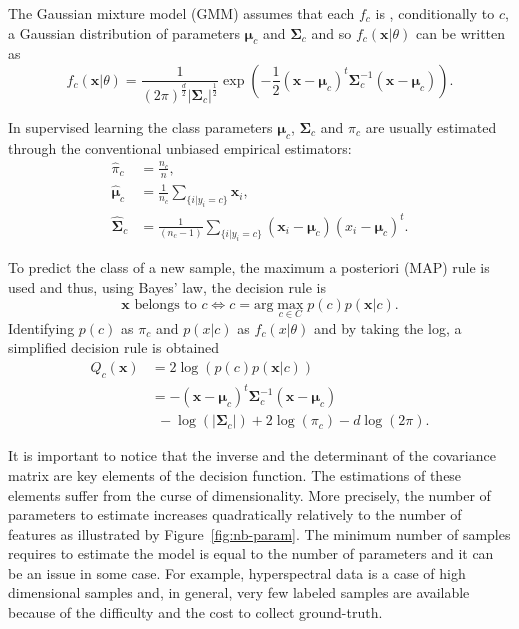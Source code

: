 \documentclass[journal,peerreview,onecolumn]{IEEEtran}
\begin{document}
    The Gaussian mixture model (GMM) assumes that each $f_c$ is , conditionally to $c$, a Gaussian distribution of parameters $\boldsymbol{\mu}_c$ and $\boldsymbol{\Sigma}_c$ and so $f_c(\mathbf{x}|\theta)$ can be written as
    \begin{equation*}
        f_c(\mathbf{x}|\theta) = \frac{1}{(2\pi)^{\frac{d}{2}} |\boldsymbol{\Sigma}_c|^{\frac{1}{2}}} \exp \left( -\frac{1}{2} (\mathbf{x} - \boldsymbol{\mu}_c)^t \boldsymbol{\Sigma}_c^{-1} (\mathbf{x} - \boldsymbol{\mu}_c) \right).
    \end{equation*}

    In supervised learning the class parameters $\boldsymbol{\mu}_c$, $\boldsymbol{\Sigma}_c$ and $\pi_c$ are usually estimated through the conventional unbiased empirical estimators:
    \begin{align}
        \hat{\pi}_c &= \frac{n_c}{n},\\
        \hat{\boldsymbol{\mu}}_c &= \frac{1}{n_c} \sum_{\{i|y_i = c\}} \mathbf{x}_i ,\\
        \hat{\boldsymbol{\Sigma}}_c &= \frac{1}{(n_c - 1)} \sum_{\{i|y_i = c\}} (\mathbf{x}_i - \boldsymbol{\mu}_c) (\boldsymbol{}x_i - \boldsymbol{\mu}_c)^t.
    \end{align}

    To predict the class of a new sample, the maximum a posteriori (MAP) rule is used and thus, using Bayes' law, the decision rule is
    \begin{equation*}
        \mathbf{x} \text{ belongs to } c \Leftrightarrow c = \text{arg} \max_{c \in C} p(c) p(\mathbf{x}|c).
    \end{equation*}
    Identifying $p(c)$ as $\pi_c$ and $p(x|c)$ as $f_c(x|\theta)$ and by taking the log, a simplified decision rule is obtained
    \begin{align}
        Q_c(\mathbf{x})
        &= 2 \log \left( p(c) p(\mathbf{x}|c) \right) \nonumber \\
        &= - (\mathbf{x} - \boldsymbol{\mu}_c)^t \boldsymbol{\Sigma}_c^{-1} (\mathbf{x} - \boldsymbol{\mu}_c) \nonumber \\
        &~~-\log (|\boldsymbol{\Sigma}_c|) + 2 \log (\pi_c) - d \log (2\pi).
        \label{eq:decision}
    \end{align}

    It is important to notice that the inverse and the determinant of the covariance matrix are key elements of the decision function. The estimations of these elements suffer from the curse of dimensionality\cite{bouveyron2014model}. More precisely, the number of parameters to estimate increases quadratically relatively to the number of features as illustrated by Figure~\ref{fig:nb-param}. The minimum number of samples requires to estimate the model is equal to the number of parameters and it can be an issue in some case. For example, hyperspectral data is a case of high dimensional samples and, in general, very few labeled samples are available because of the difficulty and the cost to collect ground-truth.
\end{document}
